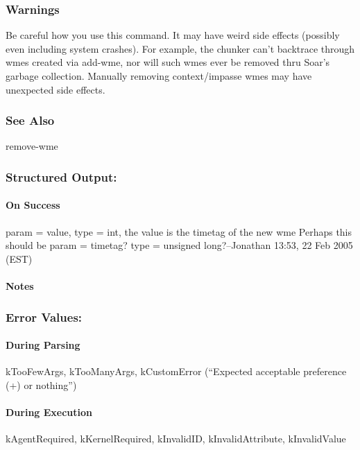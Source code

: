 \subsubsection*{Warnings}
 Be careful how you use this command. It may have weird side effects (possibly even including system crashes). For example, the chunker can't backtrace through wmes created via add-wme, nor will such wmes ever be removed thru Soar's garbage collection. Manually removing context/impasse wmes may have unexpected side effects. 
\subsubsection*{See Also}
 remove-wme
\subsubsection*{Structured Output:}
\paragraph*{On Success}
 param = value, type = int, the value is the timetag of the new wme 
 Perhaps this should be param = timetag? type = unsigned long?--Jonathan 13:53, 22 Feb 2005 (EST) 
\paragraph*{Notes}
\subsubsection*{Error Values:}
\paragraph*{During Parsing}
 kTooFewArgs, kTooManyArgs, kCustomError (``Expected acceptable preference (+) or nothing'') 
\paragraph*{During Execution}
 kAgentRequired, kKernelRequired, kInvalidID, kInvalidAttribute, kInvalidValue
